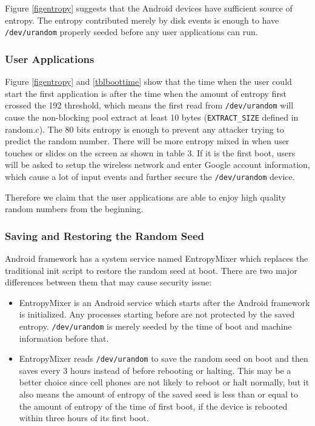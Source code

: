 Figure \ref{figentropy} suggests that the Android devices have sufficient source of entropy. The entropy contributed merely by disk events is enough to have \verb|/dev/urandom| properly seeded before any user applications can run.


\subsubsection{User Applications}

Figure \ref{figentropy} and \ref{tblboottime} show that the time when the user could start the first application is after the time when the amount of entropy first crossed the 192 threshold, which means the first read from \verb|/dev/urandom| will cause the non-blocking pool extract at least 10 bytes (\verb|EXTRACT_SIZE| defined in random.c). The 80 bits entropy is enough to prevent any attacker trying to predict the random number. There will be more entropy mixed in when user touches or slides on the screen as shown in table 3. If it is the first boot, users will be asked to setup the wireless network and enter Google account information, which cause a lot of input events and further secure the \verb|/dev/urandom| device. 

Therefore we claim that the user applications are able to enjoy high quality random numbers from the beginning.

\subsubsection{Saving and Restoring the Random Seed}

Android framework has a system service named EntropyMixer which replaces the traditional init script to restore the random seed at boot. There are two major differences between them that may cause security issue:

\begin{itemize}

\item EntropyMixer is an Android service which starts after the Android framework is initialized. Any processes starting before are not protected by the saved entropy. \verb|/dev/urandom| is merely seeded by the time of boot and machine information before that.

\item EntropyMixer reads \verb|/dev/urandom| to save the random seed on boot and then saves every 3 hours instead of before rebooting or halting. This may be a better choice since cell phones are not likely to reboot or halt normally, but it also means the amount of entropy of the saved seed is less than or equal to the amount of entropy of the time of first boot, if the device is rebooted within three hours of its first boot. 

\end{itemize}

